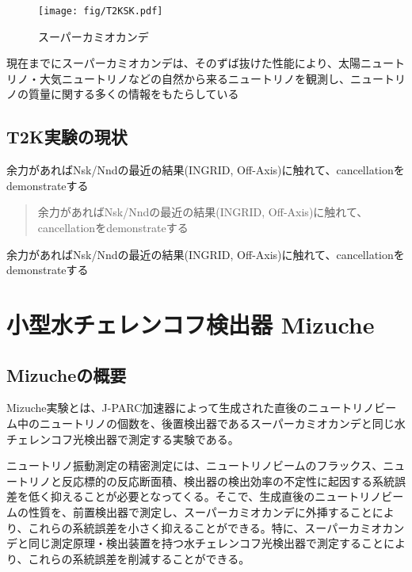 \documentclass[11pt]{jreport}
\begin{document}
\begin{figure}[!htb]
\centering
\texttt{[image: fig/T2KSK.pdf]}
\caption[スーパーカミオカンデ]{スーパーカミオカンデ}
\label{SuperKamiokande}
\end{figure}

現在までにスーパーカミオカンデは、そのずば抜けた性能により、太陽ニュートリノ・大気ニュートリノなどの自然から来るニュートリノを観測し、ニュートリノの質量に関する多くの情報をもたらしている

\section{T2K実験の現状}
余力があればNsk/Nndの最近の結果(INGRID, Off-Axis)に触れて、cancellationをdemonstrateする

\begin{quote}
余力があればNsk/Nndの最近の結果(INGRID, Off-Axis)に触れて、cancellationをdemonstrateする
\end{quote}

余力があればNsk/Nndの最近の結果(INGRID, Off-Axis)に触れて、cancellationをdemonstrateする
\fi

\chapter{小型水チェレンコフ検出器 Mizuche}

\section{Mizucheの概要}
Mizuche実験とは、J-PARC加速器によって生成された直後のニュートリノビーム中のニュートリノの個数を、後置検出器であるスーパーカミオカンデと同じ水チェレンコフ光検出器で測定する実験である。

ニュートリノ振動測定の精密測定には、ニュートリノビームのフラックス、ニュートリノと反応標的の反応断面積、検出器の検出効率の不定性に起因する系統誤差を低く抑えることが必要となってくる。そこで、生成直後のニュートリノビームの性質を、前置検出器で測定し、スーパーカミオカンデに外挿することにより、これらの系統誤差を小さく抑えることができる。特に、スーパーカミオカンデと同じ測定原理・検出装置を持つ水チェレンコフ光検出器で測定することにより、これらの系統誤差を削減することができる。
\end{document}
